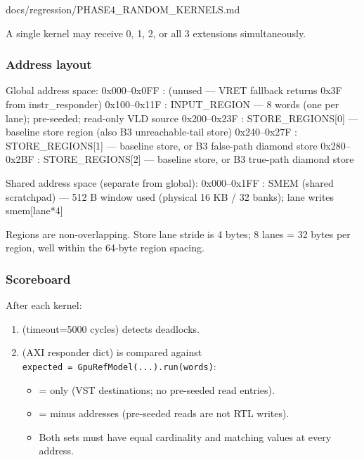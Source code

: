 \begin{relocated}{docs/regression/PHASE4_RANDOM_KERNELS.md}
{}

A single kernel may receive 0, 1, 2, or all 3 extensions simultaneously.

\subsubsection{Address layout}\label{tm:suite:phase4-random-kernels:address-layout}

\begin{textblock}
Global address space:
0x000–0x0FF : (unused — VRET fallback returns 0x3F from instr_responder)
0x100–0x11F : INPUT_REGION — 8 words (one per lane); pre-seeded; read-only VLD source
0x200–0x23F : STORE_REGIONS[0] — baseline store region (also B3 unreachable-tail store)
0x240–0x27F : STORE_REGIONS[1] — baseline store, or B3 false-path diamond store
0x280–0x2BF : STORE_REGIONS[2] — baseline store, or B3 true-path diamond store

Shared address space (separate from global):
0x000–0x1FF : SMEM (shared scratchpad) — 512 B window used (physical 16 KB / 32
              banks); lane writes smem[lane*4]
\end{textblock}

Regions are non-overlapping. Store lane stride is 4 bytes; 8 lanes = 32
bytes per region, well within the 64-byte region spacing.

\subsubsection{Scoreboard}\label{tm:suite:phase4-random-kernels:scoreboard}

After each kernel:

\begin{enumerate}
\def\labelenumi{\arabic{enumi}.}
\tightlist
\item
   (timeout=5000 cycles) detects deadlocks.
\item
   (AXI responder dict) is compared against
  \texttt{expected\ =\allowbreak{}\ GpuRefModel(.\allowbreak{}.\allowbreak{}.\allowbreak{}).\allowbreak{}run(words)}:

  \begin{itemize}
  \tightlist
  \item
     =  only (VST destinations; no
    pre-seeded read entries).
  \item
     =  minus 
    addresses (pre-seeded reads are not RTL writes).
  \item
    Both sets must have equal cardinality and matching values at every
    address.
  \end{itemize}
\end{enumerate}


\end{relocated}
